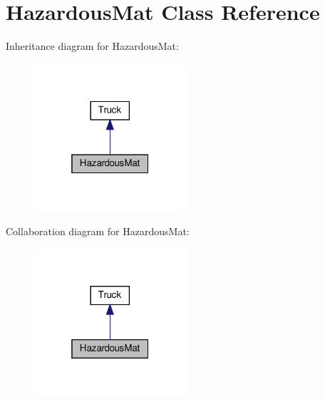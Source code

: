 \hypertarget{class_hazardous_mat}{}\section{Hazardous\+Mat Class Reference}
\label{class_hazardous_mat}


Inheritance diagram for Hazardous\+Mat\+:\nopagebreak
\begin{figure}[H]
\begin{center}
\leavevmode
\includegraphics[width=160pt]{class_hazardous_mat__inherit__graph}
\end{center}
\end{figure}


Collaboration diagram for Hazardous\+Mat\+:\nopagebreak
\begin{figure}[H]
\begin{center}
\leavevmode
\includegraphics[width=160pt]{class_hazardous_mat__coll__graph}
\end{center}
\end{figure}
